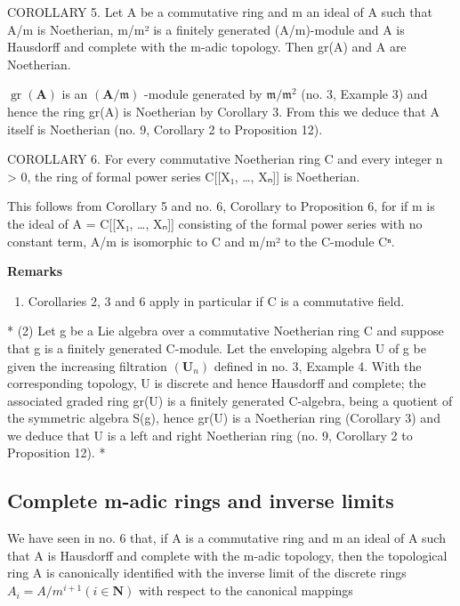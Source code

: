 COROLLARY 5. Let A be a commutative ring and m an ideal of A such that A/m is Noetherian, m/m² is a finitely generated (A/m)-module and A is Hausdorff and complete with the m-adic topology. Then gr(A) and A are Noetherian.

\(\operatorname{gr}(\mathbf{A})\) is an \((\mathbf{A} / \mathfrak{m})\) -module generated by \(\mathfrak{m} / \mathfrak{m}^2\) (no. 3, Example 3) and hence the ring gr(A) is Noetherian by Corollary 3. From this we deduce that A itself is Noetherian (no. 9, Corollary 2 to Proposition 12).

COROLLARY 6. For every commutative Noetherian ring C and every integer n \textgreater{} 0, the ring of formal power series C{[}{[}X₁, \ldots, Xₙ{]}{]} is Noetherian.

This follows from Corollary 5 and no. 6, Corollary to Proposition 6, for if m is the ideal of A = C{[}{[}X₁, \ldots, Xₙ{]}{]} consisting of the formal power series with no constant term, A/m is isomorphic to C and m/m² to the C-module Cⁿ.

\textbf{Remarks}\par

\begin{enumerate}
\def\labelenumi{(\arabic{enumi})}
\tightlist
\item
  Corollaries 2, 3 and 6 apply in particular if C is a commutative field.
\end{enumerate}

* (2) Let g be a Lie algebra over a commutative Noetherian ring C and suppose that g is a finitely generated C-module. Let the enveloping algebra U of g be given the increasing filtration \((\mathbf{U}_{n})\) defined in no. 3, Example 4. With the corresponding topology, U is discrete and hence Hausdorff and complete; the associated graded ring gr(U) is a finitely generated C-algebra, being a quotient of the symmetric algebra S(g), hence gr(U) is a Noetherian ring (Corollary 3) and we deduce that U is a left and right Noetherian ring (no. 9, Corollary 2 to Proposition 12). *

\subsection{Complete m-adic rings and inverse limits}

We have seen in no. 6 that, if A is a commutative ring and m an ideal of A such that A is Hausdorff and complete with the m-adic topology, then the topological ring A is canonically identified with the inverse limit of the discrete rings \(A_{i} = A/m^{i+1} (i \in \mathbf{N})\) with respect to the canonical mappings

